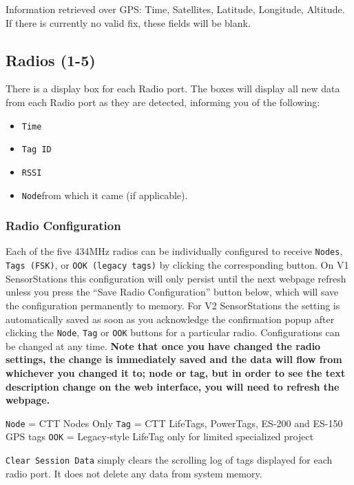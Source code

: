 \documentclass[
]{article}
\providecommand{\tightlist}{%
  \setlength{\itemsep}{0pt}\setlength{\parskip}{0pt}}
\begin{document}
Information retrieved over GPS: Time, Satellites, Latitude, Longitude,
Altitude. If there is currently no valid fix, these fields will be
blank.

\hypertarget{radios-1-5}{%
\subsection{Radios (1-5)}\label{radios-1-5}}

There is a display box for each Radio port. The boxes will display all
new data from each Radio port as they are detected, informing you of the
following:

\begin{itemize}
\tightlist
\item
  \texttt{Time}
\item
  \texttt{Tag\ ID}
\item
  \texttt{RSSI}
\item
  \texttt{Node}from which it came (if applicable).
\end{itemize}

\hypertarget{radio-configuration}{%
\subsubsection{Radio Configuration}\label{radio-configuration}}

Each of the five 434MHz radios can be individually configured to receive
\texttt{Nodes}, \texttt{Tags\ (FSK)}, or \texttt{OOK\ (legacy\ tags)} by
clicking the corresponding button. On V1 SensorStations this
configuration will only persist until the next webpage refresh unless
you press the ``Save Radio Configuration'' button below, which will save
the configuration permanently to memory. For V2 SensorStations the
setting is automatically saved as soon as you acknowledge the
confirmation popup after clicking the \texttt{Node}, \texttt{Tag} or
\texttt{OOK} buttons for a particular radio. Configurations can be
changed at any time. \textbf{Note that once you have changed the radio
settings, the change is immediately saved and the data will flow from
whichever you changed it to; node or tag, but in order to see the text
description change on the web interface, you will need to refresh the
webpage.}

\texttt{Node} = CTT Nodes Only \texttt{Tag} = CTT LifeTags, PowerTags,
ES-200 and ES-150 GPS tags \texttt{OOK} = Legacy-style LifeTag only for
limited specialized project

\texttt{Clear\ Session\ Data} simply clears the scrolling log of tags
displayed for each radio port. It does not delete any data from system
memory.
\end{document}
